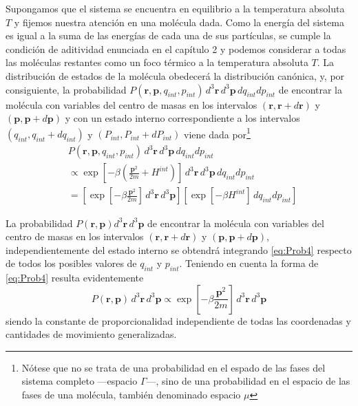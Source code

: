 Supongamos que el sistema se encuentra en equilibrio a la temperatura absoluta $T$ y fijemos nuestra atención en una molécula dada.
Como la energía del sistema es igual a la suma de las energías de cada una de sus partículas, se cumple la condición de aditividad enunciada en el capítulo 2 y podemos considerar a todas las moléculas restantes como un foco térmico a la temperatura absoluta $T$.
La distribución de estados de la molécula obedecerá la distribución canónica, y, por consiguiente, la probabilidad $P(\mathbf{r}, \mathbf{p}, q_{int}, p_{int}) \, d^3 \mathbf{r} \, d^3 \mathbf{p} \, dq_{int} dp_{int}$ de encontrar la molécula con variables del centro de masas en los intervalos $(\mathbf{r}, \mathbf{r} + d\mathbf{r})$ y $(\mathbf{p}, \mathbf{p} +d\mathbf{p})$ y con un estado interno correspondiente a los intervalos $(q_{int}, q_{int} + dq_{int})$ y $(P_{int}, P_{int} + dP_{int})$ viene dada por\footnote{Nótese que no se trata de una probabilidad en el espado de las fases del sistema completo ---espacio $\Gamma$---, sino de una probabilidad en el espacio de las fases de una molécula, también denominado espacio $\mu$}
\begin{align} \label{eq:Prob4}
	& P(\mathbf{r}, \mathbf{p}, q_{int}, p_{int}) \, d^3 \mathbf{r} \, d^3 \mathbf{p} \, dq_{int} dp_{int} \nonumber \\
	& \propto \exp \left[ -\beta\left( \frac{\mathbf{p}^2}{2m} + H^{int} \right)  \right] \, d^3 \mathbf{r} \, d^3 \mathbf{p} \, dq_{int} dp_{int} \\
	&= \left[ \exp \left[ -\beta\frac{\mathbf{p}^2}{2m} \right] \, d^3 \mathbf{r} \, d^3 \mathbf{p} \right] \left[ \exp \left[ -\beta H^{int} \right] \, dq_{int} dp_{int} \right] \nonumber
\end{align}

La probabilidad $P(\mathbf{r}, \mathbf{p}) d^3 \mathbf{r} \, d^3 \mathbf{p}$ de encontrar la molécula con variables del centro de masas en los intervalos $(\mathbf{r}, \mathbf{r} + d\mathbf{r})$ y $(\mathbf{p}, \mathbf{p} +d\mathbf{p})$, independientemente del estado interno se obtendrá integrando \eqref{eq:Prob4} respecto de todos los posibles valores de $q_{int}$ y $p_{int}$. Teniendo en cuenta la forma de \eqref{eq:Prob4} resulta evidentemente
\begin{equation}\label{eq:Prob4.3}
	P(\mathbf{r}, \mathbf{p}) \, d^3 \mathbf{r} \, d^3 \mathbf{p} \propto \exp \left[ -\beta\frac{\mathbf{p}^2}{2m} \right] \, d^3 \mathbf{r} \, d^3 \mathbf{p}
\end{equation}
siendo la constante de proporcionalidad independiente de todas las coordenadas y cantidades de movimiento generalizadas.

